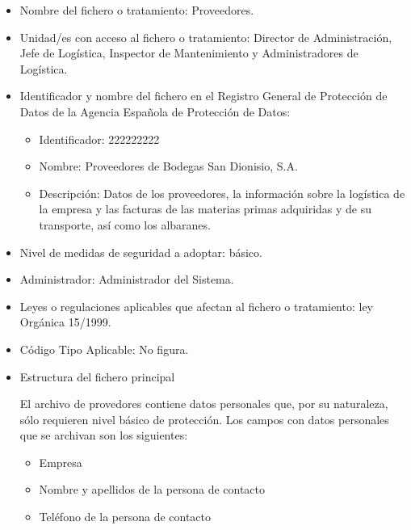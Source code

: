 \documentclass[a4paper,11pt,bibtotoc,noliststotoc]{scrbook}
\newcommand{\laorganizacion}{Bodegas San Dionisio, S.A.}
\begin{document}
\begin{itemize}
\item Nombre del fichero o tratamiento: Proveedores.

\item Unidad/es con acceso al fichero o tratamiento: Director de Administración, Jefe de Logística, Inspector de Mantenimiento y Administradores de Logística.

\item Identificador y nombre del fichero en el Registro General de Protección de Datos de la Agencia Española de Protección de Datos: 
	\begin{itemize}
	\item Identificador: 222222222
	\item Nombre: Proveedores de \laorganizacion
	\item Descripción: Datos de los proveedores, la información sobre la logística de la empresa y las facturas de las materias primas adquiridas y de su transporte, así como los albaranes.
	\end{itemize}

\item Nivel de medidas de seguridad a adoptar: básico.

\item Administrador: Administrador del Sistema.

\item Leyes o regulaciones aplicables que afectan al fichero o tratamiento: ley Orgánica 15/1999.

\item Código Tipo Aplicable: No figura.

\item Estructura del fichero principal

El archivo de provedores contiene datos personales que, por su naturaleza, sólo requieren nivel básico de protección. Los campos con datos personales que se archivan son los siguientes:

\begin{itemize}
\item Empresa
\item Nombre y apellidos de la persona de contacto
\item Teléfono de la persona de contacto
\end{itemize}



\end{itemize}
\end{document}
